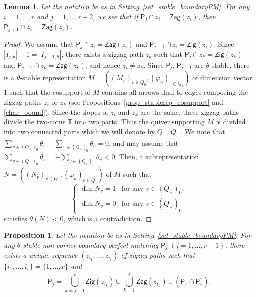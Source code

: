 \documentclass[10pt,a4paper]{amsart}
\numberwithin{equation}{section}
\newtheorem{Lemma}[Theorem]{Lemma}
\newtheorem{Proposition}[Theorem]{Proposition}
\theoremstyle{definition}
\newcommand{\TT}{\mathbb{T}}
\newcommand{\sfP}{\mathsf{P}}
\newcommand{\barone}{\underline{1}}
\newcommand{\Zig}{\mathsf{Zig}}
\newcommand{\Zag}{\mathsf{Zag}}
\newcommand{\cPM}{\sfP_\diamond}
\begin{document}
\begin{Lemma}
\label{lem_condition_stable_boundaryPM}
Let the notation be as in Setting~{\rm \ref{set_stable_boundaryPM}}.
For any $i=1, \dots, r$ and $j=1,\dots,r-2$, we see that if $\sfP_j\cap z_i=\Zag(z_i)$, then $\sfP_{j+1}\cap z_i=\Zag(z_i)$.
\end{Lemma}

\begin{proof}
We assume that $\sfP_j\cap z_i=\Zag(z_i)$ and $\sfP_{j+1}\cap z_i=\Zig(z_i)$.
Since $|I_{j,\theta}|+1=|I_{j+1,\theta}|$, there exists a zigzag path $z_k$ such that
$\sfP_j\cap z_k=\Zig(z_k)$ and $\sfP_{j+1}\cap z_k=\Zag(z_k)$, and hence $z_i\neq z_k$.
Since $\sfP_j$, $\sfP_{j+1}$ are $\theta$-stable, there is a $\theta$-stable representation $M=((M_v)_{v\in Q_0}, (\varphi_a)_{a\in Q_1})$
of dimension vector $\barone$
such that the cosupport of $M$ contains all arrows dual to edges composing the zigzag paths $z_i$ or $z_k$ (see Propositions~\ref{prop_stablerep_cosupport} and \ref{char_bound}).
Since the slopes of $z_i$ and $z_k$ are the same, these zigzag paths divide the two-torus $\TT$ into two parts.
Thus the quiver supporting $M$ is divided into two connected parts which we will denote by $Q_-$, $Q_+$.
We note that $\sum_{v\in (Q_-)_0}\theta_v+\sum_{v\in (Q_+)_0}\theta_v=0$, and may assume that
$\sum_{v\in (Q_-)_0}\theta_v=-\sum_{v\in (Q_+)_0}\theta_v<0$.
Then, a subrepresentation $N=((N_v)_{v\in Q_0}, (\varphi_a)_{a\in Q_1})$ of $M$ such that
\[
\begin{cases}
\dim N_v=1& \text{for any $v\in (Q_-)_0$}, \\
\dim N_v=0& \text{for any $v\in (Q_+)_0$}
\end{cases}
\]
satisfies $\theta(N)<0$, which is a contradiction.
\end{proof}

\begin{Proposition}
\label{prop_description_boundaryPM}
Let the notation be as in Setting~{\rm \ref{set_stable_boundaryPM}}.
For any $\theta$-stable non-corner boundary perfect matching $\sfP_j$ $(j=1, \dots, r-1)$,
there exists a unique sequence $(z_{i_1},\dots,z_{i_r})$ of zigzag paths such that
$\{i_1,\dots,i_r\}=\{1,\dots,r\}$ and
\begin{equation*}%
\sfP_j=\bigcup_{k=j+1}^r\Zig(z_{i_k})\cup\bigcup_{k=1}^j\Zag(z_{i_k})\cup (\cPM\cap\cPM^\prime ).
\end{equation*}
\end{Proposition}
\end{document}

